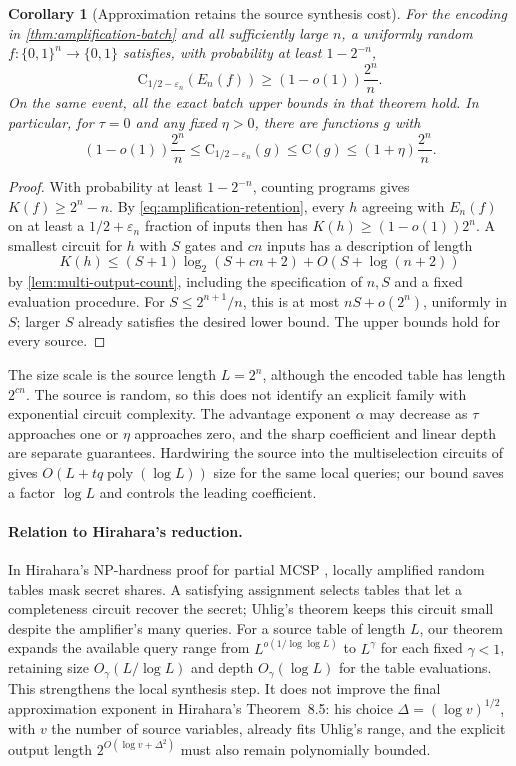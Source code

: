 \documentclass[11pt]{article}
\newtheorem{corollary}[corollary]{Corollary}
\newcommand{\bits}{\{0,1\}}
\newcommand{\C}{\mathrm{C}}
\newcommand{\poly}{\operatorname{poly}}
\begin{document}
\begin{corollary}[Approximation retains the source synthesis cost]
\label{cor:robust-synthesis}
For the encoding in \cref{thm:amplification-batch} and all sufficiently
large $n$, a uniformly random $f:\bits^n\to\bits$ satisfies,
with probability at least $1-2^{-n}$,
\[
 \C_{1/2-\varepsilon_n}(E_n(f))
       \ge (1-o(1))\frac{2^n}{n}.
\]
On the same event, all the exact batch upper bounds in that theorem
hold.  In particular, for $\tau=0$ and any fixed $\eta>0$, there
are functions $g$ with
\[
 (1-o(1))\frac{2^n}{n}
 \le\C_{1/2-\varepsilon_n}(g)
 \le\C(g)\le(1+\eta)\frac{2^n}{n}.
\]
\end{corollary}

\begin{proof}
With probability at least $1-2^{-n}$, counting programs gives
$K(f)\ge2^n-n$.  By \eqref{eq:amplification-retention}, every $h$
agreeing with $E_n(f)$ on at least a $1/2+\varepsilon_n$ fraction of
inputs then has $K(h)\ge(1-o(1))2^n$.  A smallest circuit for $h$ with
$S$ gates and $cn$ inputs has a description of length
\[
 K(h)\le(S+1)\log_2(S+cn+2)+O(S+\log(n+2))
\]
by \cref{lem:multi-output-count}, including the specification of $n,S$
and a fixed evaluation procedure.  For $S\le2^{n+1}/n$, this is at most
$nS+o(2^n)$, uniformly in $S$; larger $S$ already satisfies the desired
lower bound.  The upper bounds hold for every source.
\end{proof}

The size scale is the source length $L=2^n$, although the encoded table
has length $2^{cn}$.  The source is random, so this does not identify an
explicit family with exponential circuit complexity.  The advantage
exponent $\alpha$ may decrease as $\tau$ approaches one or $\eta$ approaches
zero, and the sharp coefficient and linear depth are separate guarantees.
Hardwiring the source into the multiselection circuits of
\cite{HolmgrenRothblum2024} gives $O(L+tq\poly(\log L))$ size for the same
local queries; our bound saves a factor $\log L$ and controls the
leading coefficient.

\paragraph{Relation to Hirahara's reduction.}
In Hirahara's NP-hardness proof for partial MCSP
\cite[Lemmas~8.1--8.3]{Hirahara2022}, locally amplified random tables mask
secret shares.  A satisfying assignment selects tables that let a
completeness circuit recover the secret; Uhlig's theorem keeps this
circuit small despite the amplifier's many queries.  For a source table
of length $L$, our theorem expands the available query range from
$L^{o(1/\log\log L)}$ to $L^\gamma$ for each fixed $\gamma<1$, retaining
size $O_\gamma(L/\log L)$ and depth $O_\gamma(\log L)$ for the table
evaluations.  This strengthens the local synthesis step.  It does not
improve the final approximation exponent in Hirahara's Theorem~8.5:
his choice $\Delta=(\log v)^{1/2}$, with $v$ the number of source variables,
already fits Uhlig's range, and the explicit output length
$2^{O(\log v+\Delta^2)}$ must also remain polynomially bounded.
\end{document}
